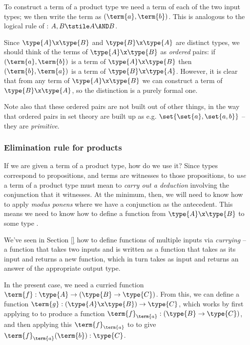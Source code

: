 To construct a term of a product type we need a term of each of the two input types; we then write the term as $(\term{a}, \term{b})$.  This is analogous to the logical rule of : $A, B \tstile A \AND B$.

Since $\type{A} \x \type{B}$ and $\type{B} \x \type{A}$ are distinct types, we should think of the terms of $\type{A} \x \type{B}$ as \emph{ordered} pairs: if $(\term{a}, \term{b})$ is a term of $\type{A} \x \type{B}$ then $(\term{b}, \term{a})$ is a term of $\type{B} \x \type{A}$.  However, it is clear that from any term of $\type{A} \x \type{B}$ we can construct a term of $\type{B} \x \type{A}$, so the distinction is a purely formal one.

Note also that these ordered pairs are not built out of other things, in the way that ordered pairs in set theory are built up as e.g. $\set{\set{a}, \set{a,b}}$ -- they are \emph{primitive}. 


\subsubsection{Elimination rule for products}
\label{sec:SimpleTT-ProductElimination}

If we are given a term of a product type, how do we use it?  
Since types correspond to propositions, and terms are witnesses to those propositions, to \emph{use} a term of a product type must mean to \emph{carry out a deduction} involving the conjunction that it witnesses.  At the minimum, then, we will need to know how to apply \emph{modus ponens} where we have a conjunction as the antecedent.  This means we need to know how to define a function from $\type{A} \x \type{B}$ to some type .


We've seen in Section \ref{} how to define functions of multiple inputs via \emph{currying} -- a function that takes two inputs  and  is written as a function that takes  as its input and returns a new function, which in turn takes  as input and returns an answer of the appropriate output type.

In the present case, we need a curried function
$\term{f}:\type{A} \to (\type{B} \to \type{C})$.  From this, we can define a function 
$\term{g}:(\type{A} \x \type{B}) \to \type{C}$, which works by first applying  to  to produce a function 
$\term{f}_{\term{a}}:(\type{B} \to \type{C})$, and then applying this $\term{f}_{\term{a}}$ to  to give 
$\term{f}_{\term{a}}
(\term{b}):\type{C}$.

